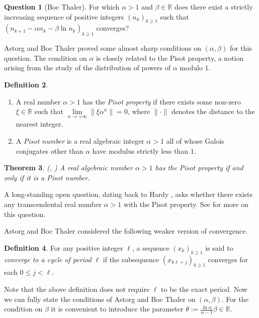 \documentclass[12pt,centertags,oneside]{amsart}
\newtheorem{theorem}{Theorem}[section]
\theoremstyle{definition}
\newtheorem{definition}[theorem]{Definition}
\newtheorem{question}[theorem]{Question}
\newcommand{\R}{\mathbb{R}}
\begin{document}
\begin{question}[Boc Thaler]\label{q:BT}
For which $\alpha>1$ and $\beta\in\mathbb{R}$ does there exist a strictly 
increasing sequence of positive integers $(n_k)_{k\geqslant 1}$ such that 
$(n_{k+1}-\alpha n_k-\beta\ln n_k)_{k\geqslant 1}$ converges? 
\end{question}

Astorg and Boc Thaler proved some almost sharp conditions on 
$(\alpha,\beta)$ for this question. The condition on $\alpha$ is closely 
related to the Pisot property, a notion arising from the study of the 
distribution of powers of $\alpha$ modulo $1$. 

\begin{definition}\label{defn-Pisot-number}\leavevmode
\begin{enumerate}  
\item A real number $\alpha>1$ has the {\em Pisot property} if there exists 
    some non-zero $\xi\in\R$ such that 
    $\lim\limits_{n\to+\infty}\|\xi\alpha^n\|=0$, where $\|\cdot\|$ denotes 
    the distance to the nearest integer. 
\item A \emph{Pisot number} is a real algebraic integer $\alpha>1$ all of 
    whose Galois conjugates other than $\alpha$ have modulus strictly less 
    than $1$. 
\end{enumerate} 
\end{definition}

\begin{theorem}(\cite{Hardy}, \cite{Pisot})
A real algebraic number $\alpha>1$ has the Pisot property if and only if it 
is a Pisot number. 
\end{theorem}

A long-standing open question, dating back to Hardy \cite{Hardy}, asks 
whether there exists any transcendental real number $\alpha>1$ with the Pisot 
property. See \cite[Chapter~2]{Bugeaud-2012} for more on this question. 

Astorg and Boc Thaler considered the following weaker version of convergence. 

\begin{definition}\cite[Definition~1.9]{Astorg-Boc Thaler-2024}
For any positive integer $\ell$,
a sequence $(x_{k})_{k \geqslant 1}$ is said to
{\em converge to a cycle of period $\ell$} 
if the subsequence $(x_{k\ell + j})_{k \geqslant 1}$ converges for each $0 \leqslant j < \ell$.
\end{definition}

Note that the above definition does not require $\ell$ to be the exact 
period. Now we can fully state the conditions of Astorg and Boc Thaler on 
$(\alpha,\beta)$. For the condition on $\beta$ it is convenient to 
introduce the parameter 
$\theta:=\frac{\ln\alpha}{\alpha-1}\beta\in\mathbb{R}$. 
\end{document}
